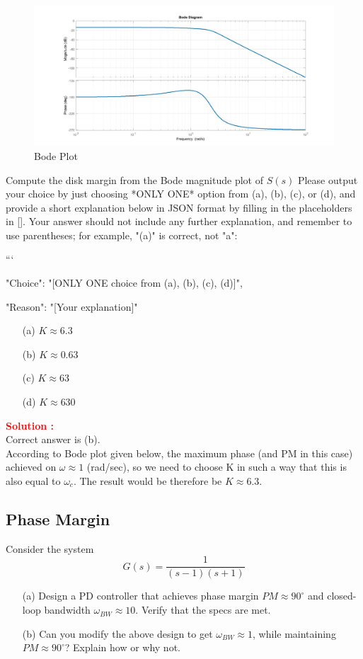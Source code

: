 \documentclass[12pt]{article}
\begin{document}
\begin{figure}[H]
    \centering
    \includegraphics[width=1\linewidth]{figs/6.15.jpg}
    \caption{Bode Plot}
    \label{fig:prb31}
\end{figure}
Compute the disk margin from the Bode magnitude plot of $S(s)$ 
Please output your choice by just choosing *ONLY ONE* option from (a), (b), (c), or (d), and provide a short explanation below in JSON format by filling in the placeholders in []. Your answer should not include any further explanation, and remember to use parentheses; for example, "(a)" is correct, not "a":

```
{

"Choice": "[ONLY ONE choice from (a), (b), (c), (d)]",

"Reason": "[Your explanation]"

}

\begin{itemize}
    \item[(a)] $K \approx 6.3$
    \item[(b)] $K \approx 0.63$
    \item[(c)] $K \approx 63$
    \item[(d)] $K \approx 630$
\end{itemize}
\textbf{\textcolor{red}{Solution :}} \\
Correct answer is (b).\\
According to Bode plot given below, the maximum phase (and PM in this case) achieved on $\omega\approx 1$ (rad/sec), so we need to choose K in such a way that this is also equal to $\omega_c$. The result would be therefore be $K \approx 6.3$.
\clearpage

\subsection{Phase Margin}
Consider the system 
\[
G(s)=\frac{1}{(s - 1)(s+1)}
\]
\begin{itemize}
    \item [(a)] Design a PD controller that achieves phase margin $PM \approx 90^\circ$ and closed-loop bandwidth $\omega_{BW} \approx 10$. Verify that the specs are met.
    \item[(b)] Can you modify the above design to get $\omega_{BW} \approx 1$, while maintaining $PM \approx 90^\circ$? Explain how or why not.
\end{itemize}
\end{document}
